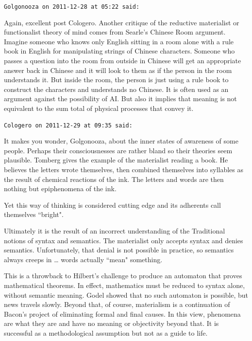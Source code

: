 \begin{footnotesize}\begin{sffamily}



\texttt{Golgonooza on 2011-12-28 at 05:22 said: }

Again, excellent post Cologero. Another critique of the reductive materialist or functionalist theory of mind comes from Searle's Chinese Room argument. Imagine someone who knows only English sitting in a room alone with a rule book in English for manipulating strings of Chinese characters. Someone who passes a question into the room from outside in Chinese will get an appropriate answer back in Chinese and it will look to them as if the person in the room understands it. But inside the room, the person is just using a rule book to construct the characters and understands no Chinese. It is often used as an argument against the possibility of AI. But also it implies that meaning is not equivalent to the sum total of physical processes that convey it.


\hfill

\texttt{Cologero on 2011-12-29 at 09:35 said: }

It makes you wonder, Golgonooza, about the inner states of awareness of some people. Perhaps their consciousnesses are rather bland so their theories seem plausible. Tomberg gives the example of the materialist reading a book. He believes the letters wrote themselves, then combined themselves into syllables as the result of chemical reactions of the ink. The letters and words are then nothing but epiphenomena of the ink.

Yet this way of thinking is considered cutting edge and its adherents call themselves ``bright".

Ultimately it is the result of an incorrect understanding of the Traditional notions of syntax and semantics. The materialist only accepts syntax and denies semantics. Unfortunately, that denial is not possible in practice, so semantics always creeps in … words actually ``mean" something.

This is a throwback to Hilbert's challenge to produce an automaton that proves mathematical theorems. In effect, mathematics must be reduced to syntax alone, without semantic meaning. Godel showed that no such automaton is possible, but news travels slowly. Beyond that, of course, materialism is a continuation of Bacon's project of eliminating formal and final causes. In this view, phenomena are what they are and have no meaning or objectivity beyond that. It is successful as a methodological assumption but not as a guide to life.



\end{sffamily}
\end{footnotesize}
